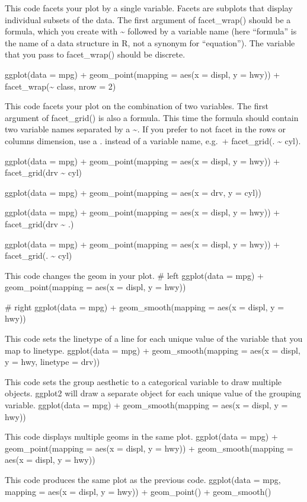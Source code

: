 \documentclass[
]{article}
\begin{document}
This code facets your plot by a single variable. Facets are subplots
that display individual subsets of the data. The first argument of
facet\_wrap() should be a formula, which you create with
\textasciitilde{} followed by a variable name (here ``formula'' is the
name of a data structure in R, not a synonym for ``equation''). The
variable that you pass to facet\_wrap() should be discrete.

ggplot(data = mpg) + geom\_point(mapping = aes(x = displ, y = hwy)) +
facet\_wrap(\textasciitilde{} class, nrow = 2)

This code facets your plot on the combination of two variables. The
first argument of facet\_grid() is also a formula. This time the formula
should contain two variable names separated by a \textasciitilde. If you
prefer to not facet in the rows or columns dimension, use a . instead of
a variable name, e.g.~+ facet\_grid(. \textasciitilde{} cyl).

ggplot(data = mpg) + geom\_point(mapping = aes(x = displ, y = hwy)) +
facet\_grid(drv \textasciitilde{} cyl)

ggplot(data = mpg) + geom\_point(mapping = aes(x = drv, y = cyl))

ggplot(data = mpg) + geom\_point(mapping = aes(x = displ, y = hwy)) +
facet\_grid(drv \textasciitilde{} .)

ggplot(data = mpg) + geom\_point(mapping = aes(x = displ, y = hwy)) +
facet\_grid(. \textasciitilde{} cyl)

This code changes the geom in your plot. \# left ggplot(data = mpg) +
geom\_point(mapping = aes(x = displ, y = hwy))

\# right ggplot(data = mpg) + geom\_smooth(mapping = aes(x = displ, y =
hwy))

This code sets the linetype of a line for each unique value of the
variable that you map to linetype. ggplot(data = mpg) +
geom\_smooth(mapping = aes(x = displ, y = hwy, linetype = drv))

This code sets the group aesthetic to a categorical variable to draw
multiple objects. ggplot2 will draw a separate object for each unique
value of the grouping variable. ggplot(data = mpg) +
geom\_smooth(mapping = aes(x = displ, y = hwy))

This code displays multiple geoms in the same plot. ggplot(data = mpg) +
geom\_point(mapping = aes(x = displ, y = hwy)) + geom\_smooth(mapping =
aes(x = displ, y = hwy))

This code produces the same plot as the previous code. ggplot(data =
mpg, mapping = aes(x = displ, y = hwy)) + geom\_point() + geom\_smooth()
\end{document}
